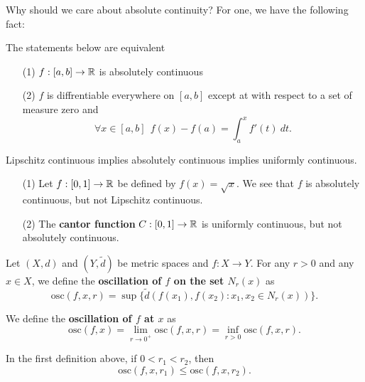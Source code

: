 Why should we care about absolute continuity? For one, we have the following fact:

The statements below are equivalent
\begin{enumerate}
    \item[(1)] \( f : [a,b] \to \mathbb{R}  \) is absolutely continuous
    \item[(2)] \( f  \) is diffrentiable everywhere on \( [a,b] \) except at with respect to a set of measure zero and 
        \[  \forall x \in [a,b] \ \ f(x) - f(a) = \int_{ a }^{ x }  f'(t) \ dt. \]
\end{enumerate}

\begin{theorem}
   Lipschitz continuous implies absolutely continuous implies uniformly continuous.  
\end{theorem}

\begin{eg}
    \begin{enumerate}
        \item[(1)] Let \( f : [0,1] \to \mathbb{R}  \) be defined by \( f(x) = \sqrt{ x  }  \). We see that \( f  \) is absolutely continuous, but not Lipschitz continuous.
        \item[(2)] The \textbf{cantor function} \( C : [0,1] \to \mathbb{R}  \) is uniformly continuous, but not absolutely continuous.
     \end{enumerate}
\end{eg}

\begin{definition}
    Let \( (X,d) \) and \( (Y,\tilde{d}) \) be metric spaces and \( f: X \to Y  \). For any \( r > 0  \) and any \( x \in X  \), we define the \textbf{oscillation of \( f  \) on the set \( {N}_{r}(x) \)} as 
    \[  \text{osc}(f, x, r) = \sup \{ \tilde{d}(f({x}_{1}), f({x}_{2}) : {x}_{1}, {x}_{2} \in {N}_{r}(x)) \}.  \]

    We define the \textbf{oscillation of \( f  \) at \( x  \)} as 
    \[  \text{osc}(f,x) = \lim_{ r \to  0^{+} }  \text{osc}(f,x,r) = \inf_{r > 0 } \text{osc}(f,x,r). \]
    \[   \]
\end{definition}

\begin{remark}
    In the first definition above, if \( 0 < {r}_{1} < {r}_{2} \), then 
    \[  \text{osc}(f,x,{r}_{1}) \leq \text{osc}(f,x,{r}_{2}). \]
\end{remark}

